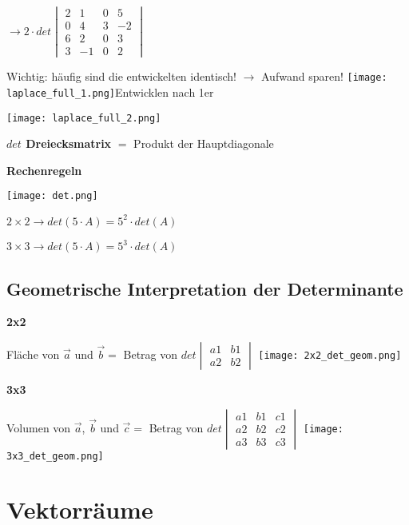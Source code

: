\begin{multicols*}{3}
{\begin{multicols}{2}
            {  $ \rightarrow  2 \cdot det \begin{vmatrix} 2 & 1 & 0 & 5 \\ 0 & 4 & 3 & -2 \\ 6 & 2 &0 & 3 \\ 3 & -1 &0 & 2 \end{vmatrix} $}
        \end{multicols}}
    {\small{Wichtig: häufig sind die entwickelten identisch! $\rightarrow$ Aufwand sparen!}}
    {\texttt{[image: laplace\_full\_1.png]}Entwicklen nach 1er}

    {\texttt{[image: laplace\_full\_2.png]}}


    \textbf{$det$ Dreiecksmatrix}
    $ = $ Produkt der Hauptdiagonale
    \WhiteSpace

    \textbf{Rechenregeln}

    {\texttt{[image: det.png]}}

    $2\times 2 \rightarrow det(5 \cdot A) = 5^2 \cdot det(A)$

    $3\times 3 \rightarrow det(5 \cdot A) = 5^3 \cdot det(A)$

    \WhiteSpace
    \subsection{Geometrische Interpretation der Determinante }
    {\textbf{2x2}}

    {Fläche von $\vec{a} $ und $ \vec{b} = $ Betrag von $ det \begin{vmatrix} a1 & b1  \\ a2 & b2 \end{vmatrix} $}
    {\texttt{[image: 2x2\_det\_geom.png]}}




    \textbf{3x3}

    {Volumen von $\vec{a} $, $ \vec{b}$ und $\vec{c} = $ Betrag von $   det \begin{vmatrix} a1 & b1 & c1 \\ a2 & b2 & c2 \\ a3 & b3 & c3  \end{vmatrix}  $}
    {\texttt{[image: 3x3\_det\_geom.png]}}
    \mbox{}

    \vfill\null
    \columnbreak
    \section{Vektorräume}


\end{multicols*}
